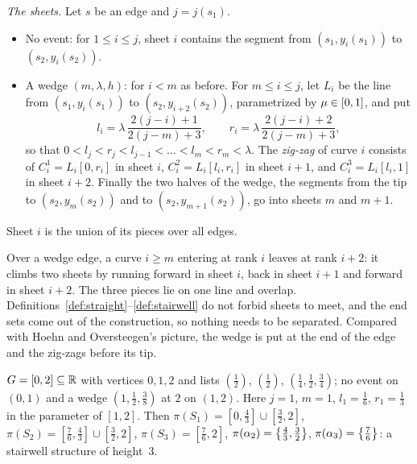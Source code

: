 \emph{The sheets.} Let $s$ be an edge and $j=j(s_1)$.
\begin{itemize}
\item No event: for $1\le i\le j$, sheet $i$ contains the segment from $(s_1,y_i(s_1))$ to $(s_2,y_i(s_2))$.
\item A wedge $(m,\lambda,h)$: for $i<m$ as before. For $m\le i\le j$, let $L_i$ be the line from $(s_1,y_i(s_1))$ to $(s_2,y_{i+2}(s_2))$, parametrized by $\mu\in[0,1]$, and put
\[
l_i=\lambda\,\frac{2(j-i)+1}{2(j-m)+3},\qquad r_i=\lambda\,\frac{2(j-i)+2}{2(j-m)+3},
\]
so that $0<l_j<r_j<l_{j-1}<\dots<l_m<r_m<\lambda$. The \emph{zig-zag} of curve $i$ consists of $C_i^1=L_i[0,r_i]$ in sheet $i$, $C_i^2=L_i[l_i,r_i]$ in sheet $i+1$, and $C_i^3=L_i[l_i,1]$ in
sheet $i+2$. Finally the two halves of the wedge, the segments from the tip to $(s_2,y_m(s_2))$ and to $(s_2,y_{m+1}(s_2))$, go into sheets $m$ and $m+1$.
\end{itemize}
Sheet $i$ is the union of its pieces over all edges.


Over a wedge edge, a curve $i\ge m$ entering at rank $i$ leaves at rank $i+2$: it climbs two sheets by running forward in sheet $i$, back in sheet $i+1$ and forward in
sheet $i+2$. The three pieces lie on one line and overlap. Definitions~\ref{def:straight}--\ref{def:stairwell} do not forbid sheets to meet, and the end sets
come out of the construction, so nothing needs to be separated. Compared with Hoehn and Oversteegen's picture, the wedge is put at the end of the edge and the zig-zags
before its tip.

\begin{example}\label{ex:ladder}
$G=[0,2]\subseteq\mathbb{R}$ with vertices $0,1,2$ and lists $(\frac12)$, $(\frac12)$, $(\frac14,\frac12,\frac34)$; no event on $(0,1)$ and a wedge $(1,\frac12,\frac38)$ at $2$ on $(1,2)$. Here $j=1$, $m=1$,
$l_1=\frac16$, $r_1=\frac13$ in the parameter of $[1,2]$. Then $\pi(S_1)=[0,\frac43]\cup[\frac32,2]$, $\pi(S_2)=[\frac76,\frac43]\cup[\frac32,2]$, $\pi(S_3)=[\frac76,2]$, $\pi(\alpha_2)=\left\{ \frac43,\frac32 \right\}$,
$\pi(\alpha_3)=\left\{ \frac76 \right\}$: a stairwell structure of height~$3$.
\end{example}


